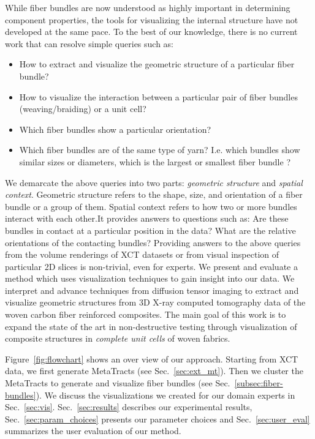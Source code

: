 While fiber bundles are now understood as highly important in determining component properties, the tools for visualizing the internal structure have not developed at the same pace.
To the best of our knowledge, there is no current work that can resolve simple queries such as:
\begin{itemize}[noitemsep]
	\item{ How to extract and visualize the geometric structure of a particular fiber bundle?}
	\item{ How to visualize the interaction between a particular pair of fiber bundles (weaving/braiding) or a unit cell?}
	\item{ Which fiber bundles show a particular orientation? }
	\item{ Which fiber bundles are of the same type of yarn? I.e. which bundles show similar sizes or diameters, which is the largest or smallest fiber bundle ?}
\end{itemize}

We demarcate the above queries into two parts: \textit{geometric structure} and \textit{spatial context}. Geometric structure refers to the shape, size, and orientation of a fiber bundle or a group of them. Spatial context refers to how two or more bundles interact with each other.It provides answers to questions such as: Are these bundles in contact at a particular position in the data? What are the relative orientations of the contacting bundles? 
Providing answers to the above queries from the volume renderings of XCT datasets or from visual inspection of particular 2D slices is non-trivial, even for experts. We present and evaluate a method which uses visualization techniques to gain insight into our data.
We interpret and advance techniques from diffusion tensor imaging to extract and visualize geometric structures from 3D X-ray computed tomography data of the woven carbon fiber reinforced composites. The main goal of this work is to expand the state of the art in non-destructive testing through visualization of composite structures in \textit{complete unit cells} of woven fabrics.

Figure~\ref{fig:flowchart} shows an over view of our approach.
Starting from XCT data, we first generate MetaTracts (see Sec.~\ref{sec:ext_mt}). Then we cluster the MetaTracts to generate and visualize fiber bundles (see Sec.~\ref{subsec:fiber-bundles}). We discuss the visualizations we created for our domain experts in Sec.~\ref{sec:vis}. Sec.~\ref{sec:results} describes our experimental results, Sec.~\ref{sec:param_choices} presents our parameter choices and  Sec.~\ref{sec:user_eval} summarizes the user evaluation of our method.
